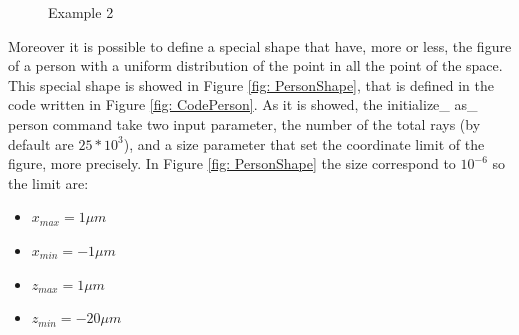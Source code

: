 \begin{figure}[H]
%
\centering
%
\quad
%
%
\caption{Example 2}
\label{fig :p2}
\end{figure}
Moreover it is possible to define a special shape that have, more or less, the figure of a person with a uniform distribution of the point in all the point of the space. This special shape is showed in Figure \ref{fig: PersonShape}, that is defined in the code written in Figure \ref{fig: CodePerson}. As it is showed, the initialize\_ as\_ person command take two input parameter, the number of the total rays (by default are $25*10^3 $), and a size parameter that set the coordinate limit of the figure, more precisely. In Figure \ref{fig: PersonShape} the size correspond to $10^{-6} $ so the limit are:
\begin{itemize}
\item $x_{max} =  1\mu m $
\item $x_{min} = -1\mu m $
\item $z_{max} = 1\mu m $
\item $z_{min} = - 20\mu m $
\end{itemize}
